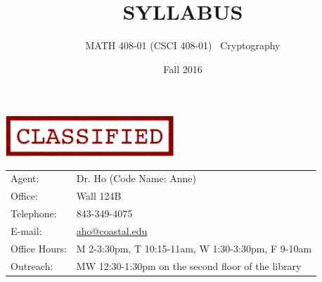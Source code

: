 \documentclass[10pt]{extarticle}
\title{SYLLABUS}
\author{\Large MATH 408-01 (CSCI 408-01) \ Cryptography}
\date{Fall 2016}
\begin{document}
\normalfont

\begin{center}\includegraphics[width=2.5in]{Classified.jpg}\end{center}
{\let\newpage\relax\maketitle}

\vspace{6pt}

\begin{tabular}{p{3cm} l}
Agent:			& Dr. Ho (Code Name: Anne)\\
Office:				& Wall 124B \\
Telephone: 		& 843-349-4075 \\
E-mail:				& \url{aho@coastal.edu} \\
Office Hours:	& M 2-3:30pm, T 10:15-11am, W 1:30-3:30pm, F 9-10am\\
Outreach: & MW 12:30-1:30pm on the second floor of the library\\
\end{tabular}


\vspace{12pt}
\vspace{2pt}
\end{document}
